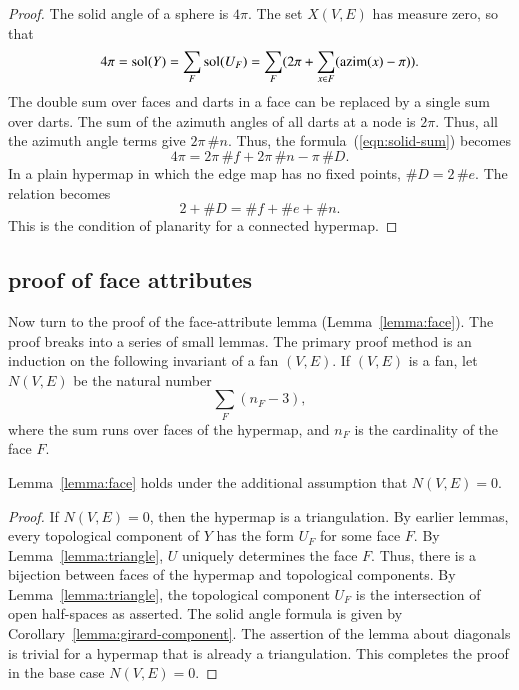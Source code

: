 \begin{proof}  The solid angle of a sphere is $4\pi$.  The set $X(V,E)$
has measure zero, so that
\begin{equation}\label{eqn:solid-sum}
4\pi = \operatorname{sol}(Y)= \sum_F \operatorname{sol}(U_F) = 
\sum_F ( 2\pi + \sum_{x\in F} ({\operatorname{azim}}(x)-\pi) ).
\end{equation}
The double sum over faces and darts in a face can be replaced by
a single sum over darts.  
The sum of the azimuth angles of all darts at a node is $2\pi$. Thus,
all the azimuth angle terms give $2\pi\,\#n$.
Thus, the formula~(\ref{eqn:solid-sum}) becomes
$$
4\pi = 2\pi\, \#f +2\pi\,\#n - \pi\, \#D.
$$
In a plain hypermap in which the edge map has no fixed points, $\#D = 2\,\#e$.
The relation becomes
$$
2 + \#D = \#f + \#e + \#n.
$$
This is the condition of planarity for a connected hypermap.
\end{proof}

\subsection{proof of face attributes}

Now turn to the proof of the face-attribute lemma (Lemma~\ref{lemma:face}).  The proof breaks into a series of small lemmas.  The primary proof method is an induction on the following invariant of a fan $(V,E)$.  If $(V,E)$ is a fan,  let $N(V,E)$ be the natural number
$$
\sum_F (n_F - 3),
$$
where the sum runs over faces of the  hypermap, and $n_F$ is the cardinality of the face $F$.

\begin{lemma} Lemma~\ref{lemma:face} holds under the additional assumption that $N(V,E) = 0$.
\end{lemma}

\begin{proof}
If $N(V,E)=0$, then the hypermap is a triangulation.  By earlier lemmas, every topological component of $Y$ has
the form $U_F$ for some face $F$.  By Lemma~\ref{lemma:triangle}, $U$ uniquely determines the face $F$.  Thus, there is a bijection between faces of the hypermap and topological components.  By Lemma~\ref{lemma:triangle}, the topological component $U_F$ is the intersection of open half-spaces as asserted.  The solid angle formula is given by Corollary~\ref{lemma:girard-component}.  The assertion of the lemma about diagonals 
is trivial for a hypermap that is already a triangulation. This completes the proof in the base case $N(V,E)=0$.
\end{proof}

